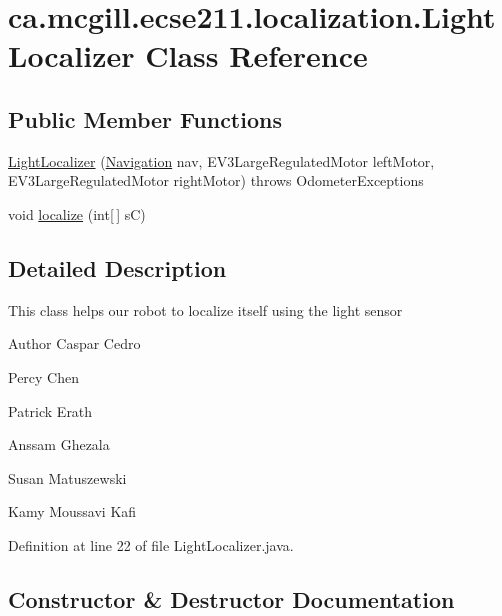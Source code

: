 \hypertarget{classca_1_1mcgill_1_1ecse211_1_1localization_1_1_light_localizer}{}\section{ca.\+mcgill.\+ecse211.\+localization.\+Light\+Localizer Class Reference}
\label{classca_1_1mcgill_1_1ecse211_1_1localization_1_1_light_localizer}
\subsection*{Public Member Functions}
\begin{DoxyCompactItemize}
\item 
\hyperlink{classca_1_1mcgill_1_1ecse211_1_1localization_1_1_light_localizer_aa37a75b7c32c02fe261845021f0734b7}{Light\+Localizer} (\hyperlink{classca_1_1mcgill_1_1ecse211_1_1project_1_1_navigation}{Navigation} nav, E\+V3\+Large\+Regulated\+Motor left\+Motor, E\+V3\+Large\+Regulated\+Motor right\+Motor)  throws Odometer\+Exceptions 
\item 
void \hyperlink{classca_1_1mcgill_1_1ecse211_1_1localization_1_1_light_localizer_a9fc3d6cdd897e9db86fc9d71dc914863}{localize} (int\mbox{[}$\,$\mbox{]} sC)
\end{DoxyCompactItemize}


\subsection{Detailed Description}
This class helps our robot to localize itself using the light sensor

\begin{DoxyAuthor}{Author}
Caspar Cedro 

Percy Chen 

Patrick Erath 

Anssam Ghezala 

Susan Matuszewski 

Kamy Moussavi Kafi 
\end{DoxyAuthor}


Definition at line 22 of file Light\+Localizer.\+java.



\subsection{Constructor \& Destructor Documentation}
\mbox{\label{classca_1_1mcgill_1_1ecse211_1_1localization_1_1_light_localizer_aa37a75b7c32c02fe261845021f0734b7}} 
